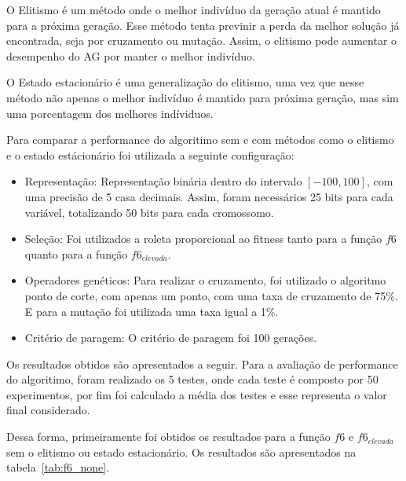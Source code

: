 O Elitismo é um método onde o melhor indivíduo da geração atual é mantido para a próxima geração.
Esse método tenta previnir a perda da melhor solução já encontrada, seja por cruzamento ou mutação.
Assim, o elitismo pode aumentar o desempenho do AG por manter o melhor indivíduo.

O Estado estacionário é uma generalização do elitismo, uma vez que nesse método não apenas o
melhor indivíduo é mantido para próxima geração, mas sim uma porcentagem dos melhores indíviduos.

Para comparar a performance do algoritimo sem e com métodos como o elitismo e o estado estácionário foi
utilizada a seguinte configuração:
\begin{itemize}
	\item Representação: Representação binária dentro do intervalo $[-100,100]$, com uma precisão
		de 5 casa decimais. Assim, foram necessários 25 bits para cada variável, totalizando 50 bits para cada cromossomo.

	\item Seleção: Foi utilizados a roleta proporcional ao fitness tanto para a função $f6$
		quanto para a função $f6_{elevada}$.

	\item Operadores genéticos: Para realizar o cruzamento, foi utilizado o algoritmo ponto de corte, com apenas um ponto,
		com uma taxa de cruzamento de 75\%. E para a mutação foi utilizada uma taxa igual a 1\%.
	\item Critério de paragem: O critério de paragem foi 100 gerações.
\end{itemize}

Os resultados obtidos são apresentados a seguir. Para a avaliação de performance do algoritimo, foram
realizado os 5 testes, onde cada teste é composto por 50 experimentos, por fim foi calculado a média
dos testes e esse representa o valor final considerado.

Dessa forma, primeiramente foi obtidos os resultados para a função $f6$ e $f6_{elevada}$ sem o elitismo ou estado estacionário.
Os resultados são apresentados na tabela~\ref{tab:f6_none}.

